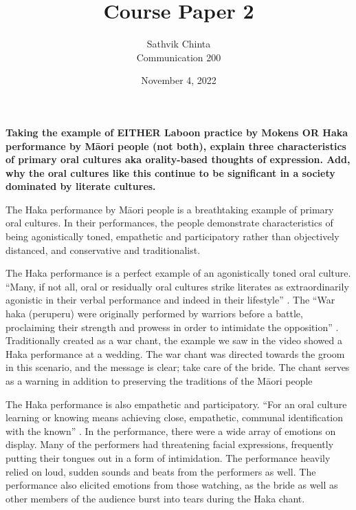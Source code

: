 \documentclass[a4paper]{article}
\title {
	Course Paper 2
}
\author {
	\normalsize Sathvik Chinta\\\normalsize
    \normalsize Communication 200\\\normalsize
}
\date {
	\color{black} November 4, 2022
}
\begin{document}
 \maketitle
    \section{}
        \textbf{Taking the example of EITHER Laboon practice by Mokens OR Haka performance by Māori people (not both), explain three characteristics of primary oral cultures aka orality-based thoughts of expression. Add, why the oral cultures like this continue to be significant in a society dominated by literate cultures.}

        The Haka performance by Māori people is a breathtaking example of primary oral cultures. 
        In their performances, the people demonstrate characteristics of being agonistically toned, 
        empathetic and participatory rather than objectively distanced, and conservative and 
        traditionalist. 

        The Haka performance is a perfect example of an agonistically toned oral culture. 
        “Many, if not all, oral or residually oral cultures strike literates as extraordinarily 
        agonistic in their verbal performance and indeed in their lifestyle” \citep{ong1982}. 
        The “War haka (peruperu) were originally performed by warriors before a battle, proclaiming 
        their strength and prowess in order to intimidate the opposition” \cite{hemo2015}. 
        Traditionally created as a war chant, the example we saw in the video showed a Haka 
        performance at a wedding. The war chant was directed towards the groom in this scenario, 
        and the message is clear; take care of the bride. The chant serves as a warning in addition
        to preserving the traditions of the Māori people

        The Haka performance is also empathetic and participatory. “For an oral culture learning 
        or knowing means achieving close, empathetic, communal identification with the known” 
        \citep{ong1982}. In the performance, there were a wide array of emotions on display.
        Many of the performers had threatening facial expressions, frequently putting their tongues 
        out in a form of intimidation. The performance heavily relied on loud, sudden sounds and 
        beats from the performers as well. The performance also elicited emotions from those watching, 
        as the bride as well as other members of the audience burst into tears during the Haka chant. 
\end{document}

